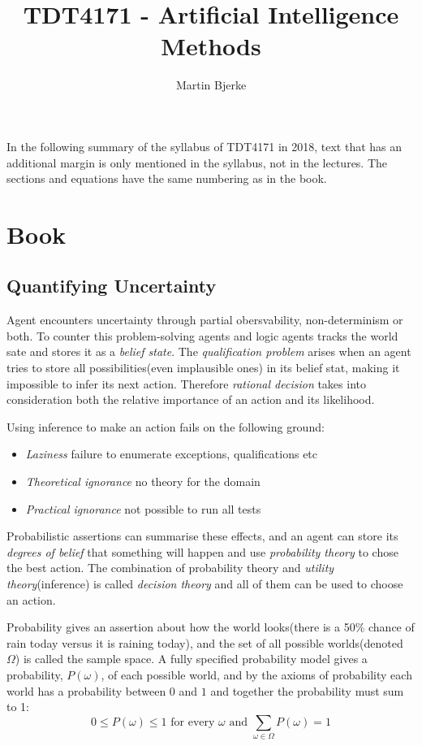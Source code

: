 \documentclass[11pt, letterpaper]{report}
\title{TDT4171 - Artificial Intelligence Methods}
\author{Martin Bjerke}
\numberwithin{equation}{section}
\begin{document}
\maketitle

\tableofcontents

\vfill

In the following summary of the syllabus of TDT4171 in 2018, text that has an
additional margin is only mentioned in the syllabus, not in the lectures. The
sections and equations have the same numbering as in the book.

\chapter{Book}

\setcounter{section}{12}
\section{Quantifying Uncertainty}
Agent encounters uncertainty through partial obersvability, non-determinism or
both. To counter this problem-solving agents and logic agents tracks the world
sate and stores it as a \emph{belief state}. The \emph{qualification problem}
arises when an agent tries to store all possibilities(even implausible ones) in
its belief stat, making it impossible to infer its next action. Therefore
\emph{rational decision} takes into consideration both the relative importance
of an action and its likelihood.

Using inference to make an action fails on the following ground:
\begin{itemize}[label={}]
\item \emph{Laziness} failure to enumerate exceptions, qualifications etc
\item \emph{Theoretical ignorance} no theory for the domain
\item \emph{Practical ignorance} not possible to run all tests
\end{itemize}

Probabilistic assertions can summarise these effects, and an agent can store
its \emph{degrees of belief} that something will happen and use
\emph{probability theory} to chose the best
action. The combination of probability theory and \emph{utility
  theory}(inference) is called \emph{decision theory} and all of them can be
used to choose an action.

Probability gives an assertion about how the world looks(there is a 50\%
chance of rain today versus it is raining today), and the set of all possible
worlds(denoted $\Omega$) is called the sample space. A fully specified probability model gives a
probability, $P(\omega)$, of each possible world, and by the axioms of
probability each world has a probability between $0$ and $1$ and together the
probability must sum to 1:
\begin{equation}
  \label{eq:axioms}
  0 \leq P(\omega) \leq 1 \text{ for every } \omega \text{ and } \sum_{\omega \in
  \Omega} P(\omega) = 1
\end{equation}
\end{document}
